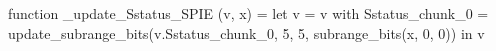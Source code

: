 function _update_Sstatus_SPIE (v, x) = let v = { v with Sstatus_chunk_0 = update_subrange_bits(v.Sstatus_chunk_0, 5, 5, subrange_bits(x, 0, 0)) } in
  v
